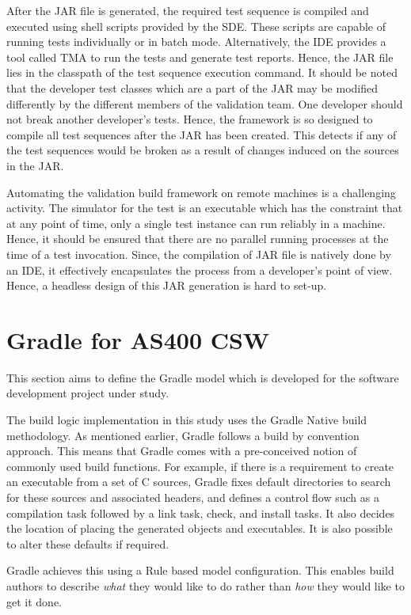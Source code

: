 \documentclass[12pt, a4paper, titlepage]{scrartcl}
\begin{document}
\par After the JAR file is generated, the required test sequence is compiled and executed using shell scripts provided by the SDE. These scripts are capable of running tests individually or in batch mode. Alternatively, the IDE provides a tool called TMA to run the tests and generate test reports. Hence, the JAR file lies in the classpath of the test sequence execution command. It should be noted that the developer test classes which are a part of the JAR may be modified differently by the different members of the validation team. One developer should not break another developer's tests. Hence, the framework is so designed to compile all test sequences after the JAR has been created. This detects if any of the test sequences would be broken as a result of changes induced on the sources in the JAR. 
\par Automating the validation build framework on remote machines is a challenging activity. The simulator for the test is an executable which has the constraint that at any point of time, only a single test instance can run reliably in a machine. Hence, it should be ensured that there are no parallel running processes at the time of a test invocation. Since, the compilation of JAR file is natively done by an IDE, it effectively encapsulates the process from a developer's point of view. Hence, a headless design of this JAR generation is hard to set-up.  

\pagebreak
\section{Gradle for AS400 CSW}
 This section aims to define the Gradle model which is developed for the software development project under study. 
\par The build logic implementation in this study uses the Gradle Native build methodology. As mentioned earlier, Gradle follows a build by convention approach. This means that Gradle comes with a pre-conceived notion of commonly used build functions. For example, if there is a requirement to create an executable from a set of C sources, Gradle fixes default directories to search for these sources and associated headers, and defines a control flow such as a compilation task followed by a link task, check, and install tasks. It also decides the location of placing the generated objects and executables. It is also possible to alter these defaults if required. 
\par Gradle achieves this using a Rule based model configuration. This enables build authors to describe \textit{what} they would like to do rather than \textit{how} they would like to get it done.
\end{document}
